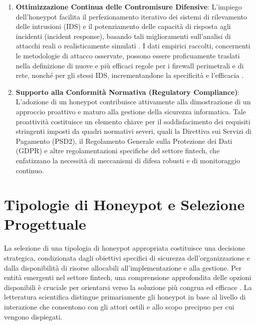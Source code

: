 \begin{enumerate}
\item \textbf{Ottimizzazione Continua delle Contromisure Difensive}: L'impiego dell'honeypot facilita il perfezionamento iterativo dei sistemi di rilevamento delle intrusioni (IDS) e il potenziamento delle capacità di risposta agli incidenti (incident response), basando tali miglioramenti sull'analisi di attacchi reali o realisticamente simulati \cite{mairh2011}. I dati empirici raccolti, concernenti le metodologie di attacco osservate, possono essere proficuamente traslati nella definizione di nuove e più efficaci regole per i firewall perimetrali e di rete, nonché per gli stessi IDS, incrementandone la specificità e l'efficacia \cite{fortinet2023}.

\item \textbf{Supporto alla Conformità Normativa (Regulatory Compliance)}: L'adozione di un honeypot contribuisce attivamente alla dimostrazione di un approccio proattivo e maturo alla gestione della sicurezza informatica. Tale proattività costituisce un elemento chiave per il soddisfacimento dei requisiti stringenti imposti da quadri normativi severi, quali la Direttiva sui Servizi di Pagamento (PSD2), il Regolamento Generale sulla Protezione dei Dati (GDPR) e altre regolamentazioni specifiche del settore fintech, che enfatizzano la necessità di meccanismi di difesa robusti e di monitoraggio continuo.

\end{enumerate}



\section{Tipologie di Honeypot e Selezione Progettuale}

\label{sec:tipologie}



La selezione di una tipologia di honeypot appropriata costituisce una decisione strategica, condizionata dagli obiettivi specifici di sicurezza dell'organizzazione e dalla disponibilità di risorse allocabili all'implementazione e alla gestione. Per entità emergenti nel settore fintech, una comprensione approfondita delle opzioni disponibili è cruciale per orientarsi verso la soluzione più congrua ed efficace \cite{perego_2023}. La letteratura scientifica distingue primariamente gli honeypot in base al livello di interazione che consentono con gli attori ostili e allo scopo precipuo per cui vengono dispiegati.



